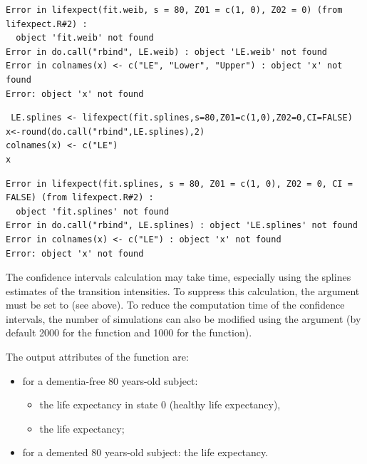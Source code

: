 \documentclass[article]{jss}
\begin{document}
\begin{verbatim}
Error in lifexpect(fit.weib, s = 80, Z01 = c(1, 0), Z02 = 0) (from lifexpect.R#2) : 
  object 'fit.weib' not found
Error in do.call("rbind", LE.weib) : object 'LE.weib' not found
Error in colnames(x) <- c("LE", "Lower", "Upper") : object 'x' not found
Error: object 'x' not found
\end{verbatim}

\lstset{language=R,numbers=none}
\begin{lstlisting}
 LE.splines <- lifexpect(fit.splines,s=80,Z01=c(1,0),Z02=0,CI=FALSE)
x<-round(do.call("rbind",LE.splines),2)
colnames(x) <- c("LE")
x
\end{lstlisting}

\begin{verbatim}
Error in lifexpect(fit.splines, s = 80, Z01 = c(1, 0), Z02 = 0, CI = FALSE) (from lifexpect.R#2) : 
  object 'fit.splines' not found
Error in do.call("rbind", LE.splines) : object 'LE.splines' not found
Error in colnames(x) <- c("LE") : object 'x' not found
Error: object 'x' not found
\end{verbatim}

The confidence intervals calculation may take time, especially using the splines estimates of the transition intensities.
To suppress this calculation, the  argument must be set to  (see above).
To reduce the computation time of the confidence intervals, the number of simulations 
can also be modified using the  argument 
(by default 2000 for the  function and 1000 for the  function).

The output attributes of  the  function are:
\begin{itemize}
\item for a dementia-free 80 years-old subject:
\begin{itemize}
\item the life expectancy in state 0 (healthy life expectancy),
\item the life expectancy;
\end{itemize}
\item for a demented 80 years-old subject: the life expectancy.
\end{itemize}
\end{document}
